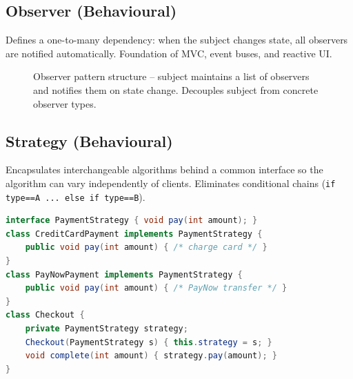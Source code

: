 \subsection{Observer (Behavioural)}

Defines a one-to-many dependency: when the subject changes state, all observers are notified automatically. Foundation of MVC, event buses, and reactive UI.

\begin{figure}[h]
\centering
{}
\caption{Observer pattern structure -- subject maintains a list of observers and notifies them on state change. Decouples subject from concrete observer types.}
\end{figure}

\subsection{Strategy (Behavioural)}

Encapsulates interchangeable algorithms behind a common interface so the algorithm can vary independently of clients. Eliminates conditional chains (\texttt{if type==A ... else if type==B}).

\begin{lstlisting}[language=Java,caption={Strategy -- interchangeable payment algorithms.}]
interface PaymentStrategy { void pay(int amount); }
class CreditCardPayment implements PaymentStrategy {
    public void pay(int amount) { /* charge card */ }
}
class PayNowPayment implements PaymentStrategy {
    public void pay(int amount) { /* PayNow transfer */ }
}
class Checkout {
    private PaymentStrategy strategy;
    Checkout(PaymentStrategy s) { this.strategy = s; }
    void complete(int amount) { strategy.pay(amount); }
}
\end{lstlisting}

